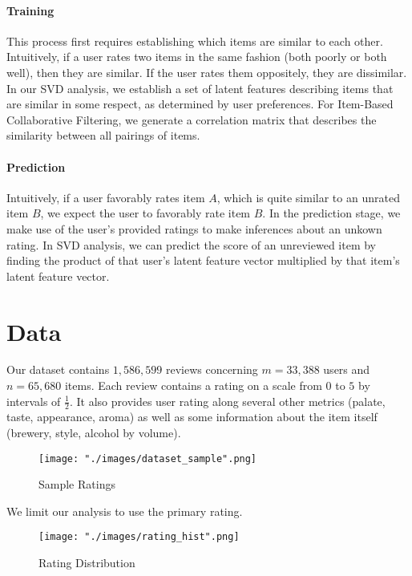 \documentclass[12pt]{article}
\begin{document}
\paragraph{Training} This process first requires establishing which items are similar to each other. Intuitively, if a user rates two items in the same fashion (both poorly or both well), then they are similar. If the user rates them oppositely, they are dissimilar. In our SVD analysis, we establish a set of latent features describing items that are similar in some respect, as determined by user preferences. For Item-Based Collaborative Filtering, we generate a correlation matrix that describes the similarity between all pairings of items.

\paragraph{Prediction} Intuitively, if a user favorably rates item $A$, which is quite similar to an unrated item $B$, we expect the user to favorably rate item $B$. In the prediction stage, we make use of the user's provided ratings to make inferences about an unkown rating. In SVD analysis, we can predict the score of an unreviewed item by finding the product of that user's latent feature vector multiplied by that item's latent feature vector.

\section{Data}
Our dataset contains $1,586,599$ reviews concerning $m = 33,388$ users and $n = 65,680$ items. Each review contains a rating on a scale from $0$ to $5$ by intervals of $\frac{1}{2}$. It also provides user rating along several other metrics (palate, taste, appearance, aroma) as well as some information about the item itself (brewery, style, alcohol by volume).

\begin{figure}[!ht]
\begin{center}
\caption{Sample Ratings}
    \texttt{[image: "./images/dataset\_sample".png]}
\end{center}
\end{figure}

We limit our analysis to use the primary rating.

\begin{figure}[!ht]
\begin{center}
\caption{Rating Distribution}
    \texttt{[image: "./images/rating\_hist".png]}
\end{center}
\end{figure}
\end{document}
